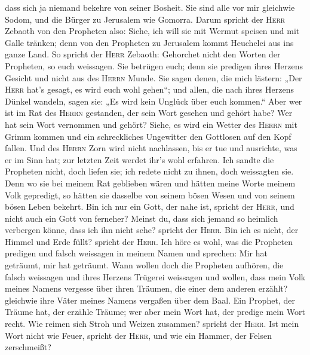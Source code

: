 dass sich ja niemand bekehre von seiner Bosheit. Sie sind alle vor mir
gleichwie Sodom, und die Bürger zu Jerusalem wie Gomorra.
 Darum spricht der \textsc{Herr} Zebaoth von den
Propheten also: Siehe, ich will sie mit Wermut speisen und mit Galle
tränken; denn von den Propheten zu Jerusalem kommt Heuchelei aus ins
ganze Land.  So spricht der \textsc{Herr} Zebaoth:
Gehorchet nicht den Worten der Propheten, so euch weissagen. Sie
betrügen euch; denn sie predigen ihres Herzens Gesicht und nicht aus des
\textsc{Herrn} Munde.  Sie sagen denen, die mich lästern:
„Der \textsc{Herr} hat's gesagt, es wird euch wohl gehen``; und allen,
die nach ihres Herzens Dünkel wandeln, sagen sie: „Es wird kein Unglück
über euch kommen.``  Aber wer ist im Rat des
\textsc{Herrn} gestanden, der sein Wort gesehen und gehört habe? Wer hat
sein Wort vernommen und gehört?  Siehe, es wird ein
Wetter des \textsc{Herrn} mit Grimm kommen und ein schreckliches
Ungewitter den Gottlosen auf den Kopf fallen.  Und des
\textsc{Herrn} Zorn wird nicht nachlassen, bis er tue und ausrichte, was
er im Sinn hat; zur letzten Zeit werdet ihr's wohl erfahren.
 Ich sandte die Propheten nicht, doch liefen sie; ich
redete nicht zu ihnen, doch weissagten sie.  Denn wo sie
bei meinem Rat geblieben wären und hätten meine Worte meinem Volk
gepredigt, so hätten sie dasselbe von seinem bösen Wesen und von seinem
bösen Leben bekehrt.  Bin ich nur ein Gott, der nahe ist,
spricht der \textsc{Herr}, und nicht auch ein Gott von ferneher?
 Meinst du, dass sich jemand so heimlich verbergen könne,
dass ich ihn nicht sehe? spricht der \textsc{Herr}. Bin ich es nicht,
der Himmel und Erde füllt? spricht der \textsc{Herr}. 
Ich höre es wohl, was die Propheten predigen und falsch weissagen in
meinem Namen und sprechen: Mir hat geträumt, mir hat geträumt.
 Wann wollen doch die Propheten aufhören, die falsch
weissagen und ihres Herzens Trügerei weissagen  und
wollen, dass mein Volk meines Namens vergesse über ihren Träumen, die
einer dem anderen erzählt? gleichwie ihre Väter meines Namens vergaßen
über dem Baal.  Ein Prophet, der Träume hat, der erzähle
Träume; wer aber mein Wort hat, der predige mein Wort recht. Wie reimen
sich Stroh und Weizen zusammen? spricht der \textsc{Herr}.
 Ist mein Wort nicht wie Feuer, spricht der
\textsc{Herr}, und wie ein Hammer, der Felsen zerschmeißt?

